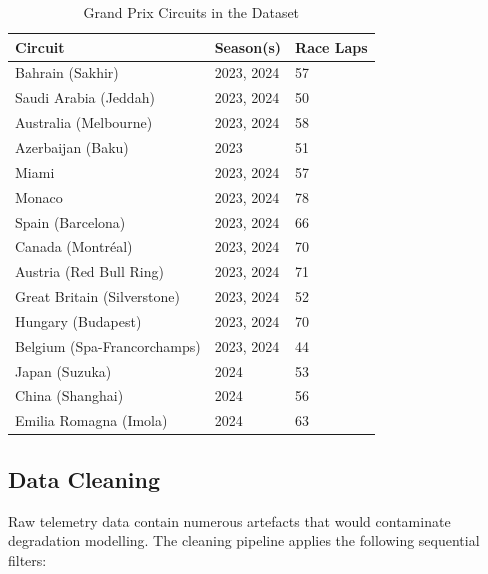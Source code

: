 \documentclass[journal,twoside]{IEEEtran}
\begin{document}
\begin{table}[!t]
\caption{Grand Prix Circuits in the Dataset}
\label{tab:circuits}
\centering
\footnotesize
\begin{tabular}{@{}lll@{}}
\toprule
\textbf{Circuit} & \textbf{Season(s)} & \textbf{Race Laps} \\
\midrule
Bahrain (Sakhir)              & 2023, 2024 & 57 \\
Saudi Arabia (Jeddah)         & 2023, 2024 & 50 \\
Australia (Melbourne)         & 2023, 2024 & 58 \\
Azerbaijan (Baku)             & 2023       & 51 \\
Miami                         & 2023, 2024 & 57 \\
Monaco                        & 2023, 2024 & 78 \\
Spain (Barcelona)             & 2023, 2024 & 66 \\
Canada (Montr\'eal)           & 2023, 2024 & 70 \\
Austria (Red Bull Ring)       & 2023, 2024 & 71 \\
Great Britain (Silverstone)   & 2023, 2024 & 52 \\
Hungary (Budapest)            & 2023, 2024 & 70 \\
Belgium (Spa-Francorchamps)   & 2023, 2024 & 44 \\
Japan (Suzuka)                & 2024       & 53 \\
China (Shanghai)              & 2024       & 56 \\
Emilia Romagna (Imola)        & 2024       & 63 \\
\bottomrule
\end{tabular}
\end{table}

\subsection{Data Cleaning}\label{sec:cleaning}

Raw telemetry data contain numerous artefacts that would contaminate
degradation modelling.  The cleaning pipeline applies the following
sequential filters:
\end{document}
